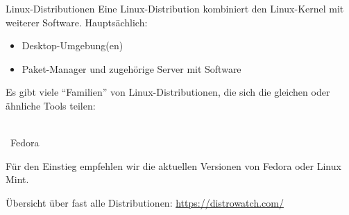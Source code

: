 \begin{frame}{Linux-Distributionen}
    Eine Linux-Distribution kombiniert den Linux-Kernel mit weiterer Software. Hauptsächlich:
    \begin{itemize}
        \item Desktop-Umgebung(en)
        \item Paket-Manager und zugehörige Server mit Software
    \end{itemize}

    Es gibt viele \enquote{Familien} von Linux-Distributionen, die sich die gleichen oder ähnliche Tools teilen:
    \begin{center}
        \hspace{0.5cm} \\[1\baselineskip]

        ~{\Huge Fedora}
        \hspace{0.5cm}
    \end{center}

    Für den Einstieg empfehlen wir die aktuellen Versionen von Fedora oder Linux Mint.

    Übersicht über fast alle Distributionen: \url{https://distrowatch.com/}
\end{frame}

